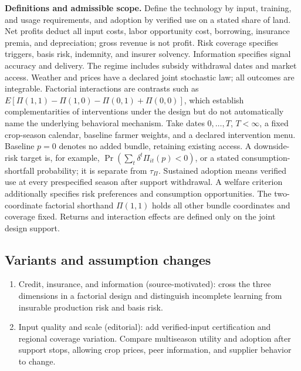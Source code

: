 \documentclass[11pt,a4paper]{article}
\begin{document}
\textbf{Definitions and admissible scope.} Define the technology by input, training, and usage requirements, and adoption by verified use on a stated share of land. Net profits deduct all input costs, labor opportunity cost, borrowing, insurance premia, and depreciation; gross revenue is not profit. Risk coverage specifies triggers, basis risk, indemnity, and insurer solvency. Information specifies signal accuracy and delivery. The regime includes subsidy withdrawal dates and market access. Weather and prices have a declared joint stochastic law; all outcomes are integrable. Factorial interactions are contrasts such as \(E[\Pi(1,1)-\Pi(1,0)-\Pi(0,1)+\Pi(0,0)]\), which establish complementarities of interventions under the design but do not automatically name the underlying behavioral mechanism. Take dates \(0,\ldots,T\), \(T<\infty\), a fixed crop-season calendar, baseline farmer weights, and a declared intervention menu. Baseline \(p=0\) denotes no added bundle, retaining existing access. A downside-risk target is, for example, \(\Pr(\sum_t\delta^t\Pi_{it}(p)<0)\), or a stated consumption-shortfall probability; it is separate from \(\tau_\Pi\). Sustained adoption means verified use at every prespecified season after support withdrawal. A welfare criterion additionally specifies risk preferences and consumption opportunities. The two-coordinate factorial shorthand \(\Pi(1,1)\) holds all other bundle coordinates and coverage fixed. Returns and interaction effects are defined only on the joint design support.
\subsection*{Variants and assumption changes}
\begin{enumerate}
\item Credit, insurance, and information (source-motivated): cross the three dimensions in a factorial design and distinguish incomplete learning from insurable production risk and basis risk.
\item Input quality and scale (editorial): add verified-input certification and regional coverage variation. Compare multiseason utility and adoption after support stops, allowing crop prices, peer information, and supplier behavior to change.
\end{enumerate}
\end{document}
